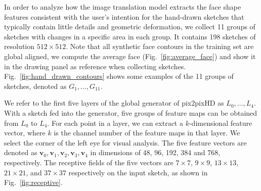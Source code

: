 \documentclass{article}
\begin{document}
 
In order to analyze how the image translation model extracts the face shape features consistent with the user's intention for the hand-drawn sketches that typically contain little details and geometric deformation, we collect 11 groups of sketches with changes in a specific area in each group. It contains 198 sketches of resolution $512\times512$. 
Note that all synthetic face contours in the training set are global aligned, we compute the average face (Fig.~\ref{fig:average_face}) and show it in the drawing panel as reference when collecting sketches. 
%
Fig.~\ref{fig:hand_drawn_contours} shows some examples of the 11 groups of sketches, denoted as $G_1,\ldots,G_{11}$.

We refer to the first five layers of the global generator of pix2pixHD as $L_0,\ldots,L_4$. 
With a sketch fed into the generator, five groups of feature maps can be obtained from $L_0$ to $L_4$.
For each point in a layer, we can extract a $k$-dimensional feature vector, where $k$ is the channel number of the feature maps in that layer.
We select the corner of the left eye for visual analysis. 
The five feature vectors are denoted as $\boldsymbol{v}_0,\boldsymbol{v}_1,\boldsymbol{v}_2,\boldsymbol{v}_3,\boldsymbol{v}_4$ in dimensions of 48, 96, 192, 384 and 768, respectively. 
The receptive fields of the five vectors are $7\times7$, $9\times9$, $13\times13$, $21\times21$, and $37\times37$ respectively on the input sketch, as shown in Fig.~\ref{fig:receptive}. 

\end{document}
